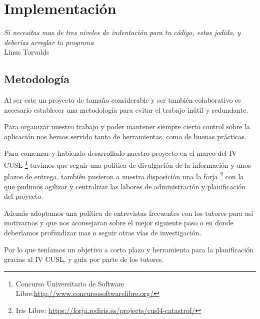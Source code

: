 
\chapter*{Implementación} \label{cap5}


\begin{flushright}
\begin{minipage}{7.85cm}
    {\em Si necesitas mas de tres niveles de indentación para tu código, estas
jodido, y deberías arreglar tu programa} \\  Linus Torvalds
\end{minipage}
\end{flushright}

\vspace*{5mm}

\section*{Metodología}
Al ser este un proyecto de tamaño considerable y ser también colaborativo es
necesario establecer una metodología para evitar el trabajo inútil y redundante.

Para organizar nuestro trabajo y poder mantener siempre cierto control sobre la
aplicación nos hemos servido tanto de herramientas, como de buenas prácticas.

Para comenzar y habiendo desarrollado nuestro proyecto en el marco del IV CUSL
\footnote{Concurso Universitario de
Software Libre:\url{http://www.concursosoftwarelibre.org/}} tuvimos que seguir
una política de divulgación de la información y unos plazos de entrega, también
pusieron a nuestra disposición una la forja
\footnote{Iris Libre: \url{https://forja.rediris.es/projects/cusl4-catastrof/}}
con la que pudimos agilizar y centralizar las labores de administración y
planificación del proyecto.

Además adoptamos una política de entrevistas frecuentes con los tutores para
así motivarnos y que nos aconsejaran sobre el mejor siguiente paso o en donde
deberíamos profundizar mas o seguir otras vías de investigación.

Por lo que teníamos un objetivo a corto plazo y herramienta para la
planificación gracias al  IV CUSL, y guía por parte de los tutores.

